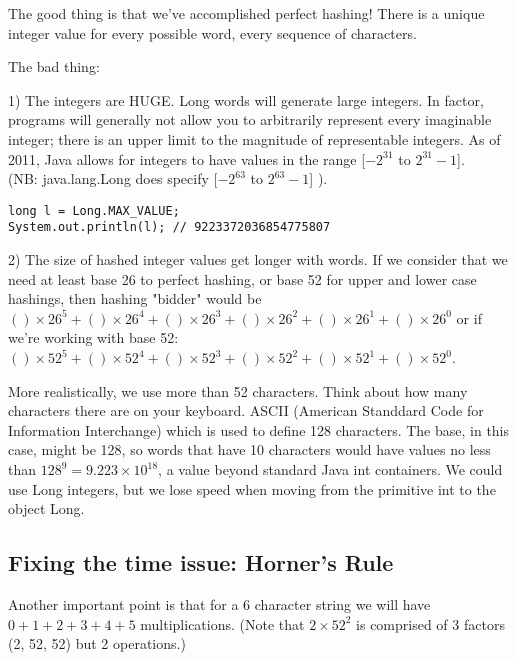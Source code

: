 \documentclass[11pt]{article} %
\begin{document}

The good thing is that we've accomplished perfect hashing!  There is a unique integer value for every possible word, every sequence of characters.

The bad thing: 

1) The integers are HUGE.  Long words will generate large integers.  In factor, programs will generally not allow you to arbitrarily represent every imaginable integer; there is an upper limit to the magnitude of representable integers.  As of 2011, Java allows for integers to have  values in the range [$-2^{31}$ to  $2^{31}-1$]. \\


 (NB: java.lang.Long does specify  [$-2^{63}$ to  $2^{63}-1$] ).

\begin{verbatim}
long l = Long.MAX_VALUE;
System.out.println(l); // 9223372036854775807
\end{verbatim}

2)  The size of hashed integer values get longer with words.  If we consider that we need at least base 26 to perfect hashing, or base 52 for upper and lower case hashings, then hashing "bidder" would be $( ) \times 26^5+  ( ) \times 26^4+ ( ) \times 26^3+ ( ) \times 26^2+( ) \times 26^1+ ( ) \times 26^0$  or if we're working with base 52:  $( ) \times 52^5+  ( ) \times 52^4+ ( ) \times 52^3+ ( ) \times 52^2+( ) \times 52^1+ ( ) \times 52^0$. 

More realistically, we use more than 52 characters.  Think about how many characters there are on your keyboard.  ASCII (American Standdard Code for Information Interchange) which is used to define 128 characters.  The base, in this case, might be 128, so words that have 10 characters would have values no less than $128^9 = 9.223 \times 10^{18}$, a value beyond standard Java int containers.  We could use Long integers, but we lose speed when moving from the primitive int to the object Long.

\subsection{Fixing the time issue: Horner's Rule}
Another important point is that for a 6 character string we will have  $0 + 1 + 2 + 3 + 4 + 5$ multiplications.  (Note that $2 \times 52^2$ is comprised of 3 factors (2, 52, 52) but 2 operations.)
\end{document}
